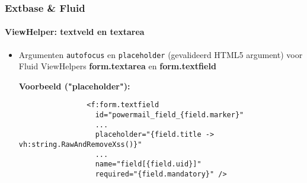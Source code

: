 
\begin{frame}[fragile]
	\frametitle{Extbase \& Fluid}
	\framesubtitle{ViewHelper: textveld en textarea}

	\begin{itemize}
		\item Argumenten \texttt{autofocus} en \texttt{placeholder} (gevalideerd HTML5 argument) voor Fluid ViewHelpers \textbf{form.textarea} en \textbf{form.textfield}\newline

			\smaller\textbf{Voorbeeld ("placeholder"):}\normalsize
			\begin{lstlisting}
				<f:form.textfield
				  id="powermail_field_{field.marker}"
				  ...
				  placeholder="{field.title -> vh:string.RawAndRemoveXss()}"
				  ...
				  name="field[{field.uid}]"
				  required="{field.mandatory}" />
			\end{lstlisting}

	\end{itemize}

\end{frame}


